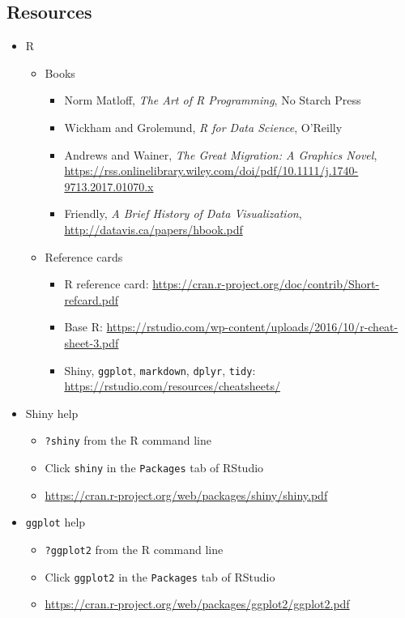 \documentclass[10pt, letterpaper]{article}
\begin{document}
\begin{spacing}{1.0}
\section{Resources}\label{sec:resources}

\begin{itemize}

  \item R
    \begin{itemize}   
      \item Books
        \begin{itemize}
          \item Norm Matloff, \textit{The Art of R Programming}, No Starch Press
          \item Wickham and Grolemund, \textit{R for Data Science}, O'Reilly
          \item Andrews and Wainer, \textit{The Great Migration:  A Graphics Novel}, \url{https://rss.onlinelibrary.wiley.com/doi/pdf/10.1111/j.1740-9713.2017.01070.x}
          \item Friendly, \textit{A Brief History of Data Visualization}, \url{http://datavis.ca/papers/hbook.pdf}
        \end{itemize}
      \item Reference cards
        \begin{itemize}
          \item R reference card:  \url{https://cran.r-project.org/doc/contrib/Short-refcard.pdf}
          \item Base R:  \url{https://rstudio.com/wp-content/uploads/2016/10/r-cheat-sheet-3.pdf}
          \item Shiny, \texttt{ggplot}, \texttt{markdown}, \texttt{dplyr}, \texttt{tidy}: \url{https://rstudio.com/resources/cheatsheets/}
        \end{itemize}
    \end{itemize}

  \item Shiny help
    \begin{itemize}
        \item \texttt{?shiny} from the R command line
        \item Click \texttt{shiny} in the \texttt{Packages} tab of RStudio
        \item \url{https://cran.r-project.org/web/packages/shiny/shiny.pdf}
    \end{itemize}

  \item \texttt{ggplot} help
    \begin{itemize}
        \item \texttt{?ggplot2} from the R command line
        \item Click \texttt{ggplot2} in the \texttt{Packages} tab of RStudio
        \item \url{https://cran.r-project.org/web/packages/ggplot2/ggplot2.pdf}
    \end{itemize}


\end{itemize}
\end{spacing}
\end{document}
